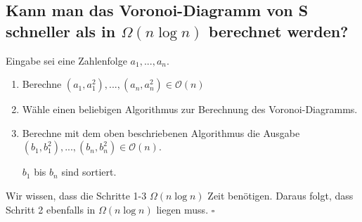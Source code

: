 \documentclass[a4paper]{article}
\begin{document}
\subsection*{Kann man das Voronoi-Diagramm von S schneller als in $\Omega(n \log n)$ berechnet werden?}

Eingabe sei eine Zahlenfolge $a_1, ..., a_n$.

\begin{enumerate}
 \item Berechne $(a_1, a_1^2), ..., (a_n, a_n^2) \in \mathcal{O}(n)$
 \item Wähle einen beliebigen Algorithmus zur Berechnung des Voronoi-Diagramms.
 \item Berechne mit dem oben beschriebenen Algorithmus die Ausgabe $(b_1, b_1^2), ..., (b_n, b_n^2) \in \mathcal{O}(n)$. 
 
       $b_1$ bis $b_n$ sind sortiert. 
\end{enumerate}

Wir wissen, dass die Schritte 1-3 $\Omega(n \log n)$ Zeit benötigen. Daraus folgt, dass Schritt 2 ebenfalls in $\Omega(n \log n)$ liegen muss. $\square$	
\end{document}
